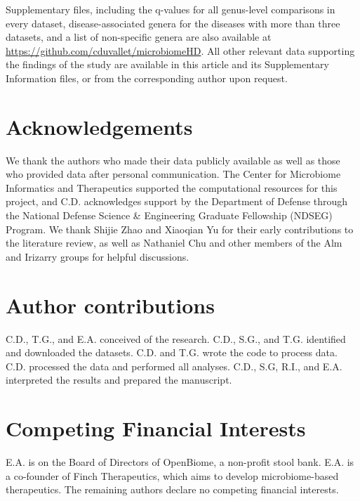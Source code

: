 \documentclass{article}
\begin{document}
{Supplementary files, including the q-values for all genus-level comparisons in every dataset, disease-associated genera for the diseases with more than three datasets, and a list of non-specific genera are also available at \url{https://github.com/cduvallet/microbiomeHD}.
All other relevant data supporting the findings of the study are available in this article and its Supplementary Information files, or from the corresponding author upon request.

\section*{Acknowledgements}

We thank the authors who made their data publicly available as well as those who provided data after personal communication.
The Center for Microbiome Informatics and Therapeutics supported the computational resources for this project, and C.D. acknowledges support by the Department of Defense through the National Defense Science \& Engineering Graduate Fellowship (NDSEG) Program.
We thank Shijie Zhao and Xiaoqian Yu for their early contributions to the literature review, as well as Nathaniel Chu and other members of the Alm and Irizarry groups for helpful discussions.

\section*{Author contributions}

C.D., T.G., and E.A. conceived of the research.
C.D., S.G., and T.G. identified and downloaded the datasets.
C.D. and T.G. wrote the code to process data.
C.D. processed the data and performed all analyses.
C.D., S.G, R.I., and E.A. interpreted the results and prepared the manuscript.

\section*{Competing Financial Interests}

E.A. is on the Board of Directors of OpenBiome, a non-profit stool bank. E.A. is a co-founder of Finch Therapeutics, which aims to develop microbiome-based therapeutics.
The remaining authors declare no competing financial interests.

\FloatBarrier

}
\end{document}
